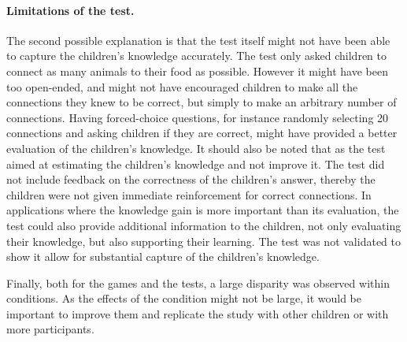 \paragraph{Limitations of the test.} The second possible explanation is that the test itself might not have been able to capture the children's knowledge accurately. The test only asked children to connect as many animals to their food as possible. However it might have been too open-ended, and might not have encouraged children to make all the connections they knew to be correct, but simply to make an arbitrary number of connections. %
Having forced-choice questions, for instance randomly selecting 20 connections and asking children if they are correct, might have provided a better evaluation of the children's knowledge. It should also be noted that as the test aimed at estimating the children's knowledge and not improve it. The test did not include feedback on the correctness of the children's answer, thereby the children were not given immediate reinforcement for correct connections. In applications where the knowledge gain is more important than its evaluation, the test could also provide additional information to the children, not only evaluating their knowledge, but also supporting their learning. The test was not validated to show it allow for substantial capture of the children's knowledge.

Finally, both for the games and the tests, a large disparity was observed within conditions. As the effects of the condition might not be large, it would be important to improve them and replicate the study with other children or with more participants.



